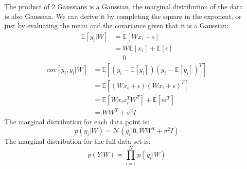 \documentclass[a4paper,11pt]{article}
\theoremstyle{mytheor}
\begin{document}
The product of 2 Gaussians is a Gaussian, the marginal distribution of the data is also Gaussian. We can derive it by completing the square in the exponent, or just by evaluating the mean and the covariance given that it is a Gaussian:
\begin{equation*}
\begin{split}
\mathbb{E}[y_i|W] &= \mathbb{E}[W x_i +\epsilon]\\
                &= W \mathbb{E}[x_i] + \mathbb{E}[\epsilon]\\
                &=0
\end{split}
\end{equation*}
\begin{equation*}
\begin{split}
cov[y_i,y_i|W] &= \mathbb{E}[(y_i -\mathbb{E}[y_i])(y_i -\mathbb{E}[y_i])^T]\\
&= \mathbb{E}[(W x_i +\epsilon)(W x_i +\epsilon)^T]\\
& = \mathbb{E}[W x_i x_i^T W^T] + \mathbb{E}[\epsilon \epsilon^T]\\
&= WW^T + \sigma^2I
\end{split}
\end{equation*}
The marginal distribution for each data point is:
\begin{equation*}
p(y_i|W) = \mathcal{N}(y_i| 0 , WW^T + \sigma^2I) 
\end{equation*}
The marginal distribution for the full data set is: 
\begin{equation*}
p(Y|W) = \prod\limits_{i=1}^{N} p(y_i|W)
\end{equation*}
\end{document}
